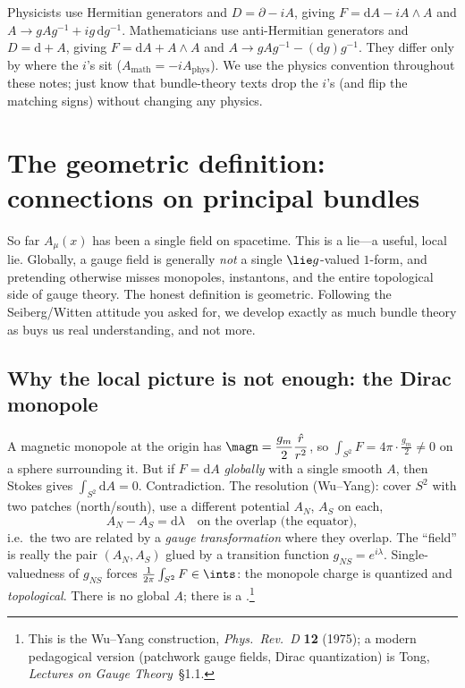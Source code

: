 \documentclass[11pt]{article}
\newcommand{\dd}{\mathrm{d}}                 %
\begin{document}
\begin{nnote}
Physicists use Hermitian generators and $D=\partial - iA$, giving $F=\dd A - iA\wedge A$
and $A\to gAg^{-1}+ig\,\dd g^{-1}$. Mathematicians use anti-Hermitian generators and
$D=\dd + A$, giving $F=\dd A + A\wedge A$ and $A\to gAg^{-1}-(\dd g)g^{-1}$. They differ
only by where the $i$'s sit ($A_{\text{math}} = -iA_{\text{phys}}$). We use the physics
convention throughout these notes; just know that bundle-theory texts drop the $i$'s
(and flip the matching signs) without changing any physics.
\end{nnote}

\section{The geometric definition: connections on principal bundles}
\label{sec:bundles}

So far $A_\mu(x)$ has been a single field on spacetime. This is a lie---a useful, local
lie. Globally, a gauge field is generally \emph{not} a single $\lie g$-valued $1$-form,
and pretending otherwise misses monopoles, instantons, and the entire topological side
of gauge theory. The honest definition is geometric. Following the Seiberg/Witten
attitude you asked for, we develop exactly as much bundle theory as buys us real
understanding, and not more.

\subsection{Why the local picture is not enough: the Dirac monopole}

\begin{eexample}
\label{ex:monopole}
A magnetic monopole at the origin has $\magn = \dfrac{g_m}{2}\dfrac{\hat r}{r^2}$, so
$\int_{S^2} F = 4\pi\cdot\frac{g_m}{2}\neq 0$ on a sphere surrounding it. But if
$F=\dd A$ \emph{globally} with a single smooth $A$, then Stokes gives
$\int_{S^2}\dd A = 0$. Contradiction. The resolution (Wu--Yang): cover $S^2$ with two
patches (north/south), use a different potential $A_N$, $A_S$ on each,
\[
A_N - A_S = \dd\lambda \quad\text{on the overlap (the equator)},
\]
i.e.\ the two are related by a \emph{gauge transformation} where they overlap. The
``field'' is really the pair $(A_N,A_S)$ glued by a transition function
$g_{NS}=e^{i\lambda}$. Single-valuedness of $g_{NS}$ forces $\frac{1}{2\pi}\int_{S^2}F
\in\ints$: the monopole charge is quantized and \emph{topological}. There is no global
$A$; there is a .\footnote{This is the Wu--Yang construction,
\emph{Phys.\ Rev.\ D} \textbf{12} (1975); a modern pedagogical version (patchwork gauge
fields, Dirac quantization) is Tong, \emph{Lectures on Gauge Theory}~\S1.1.}
\end{eexample}
\end{document}
